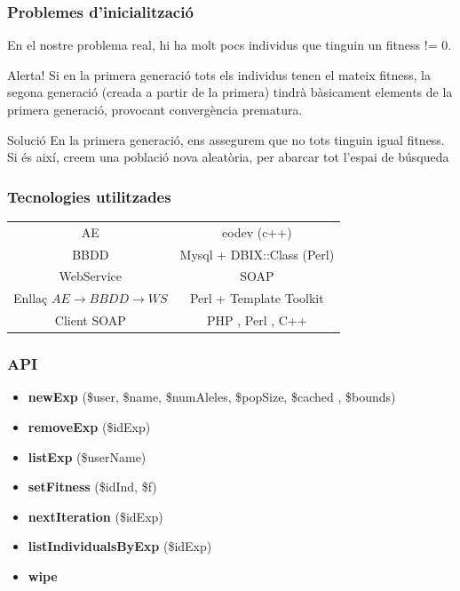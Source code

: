 \documentclass{beamer}
\begin{document}
\begin{frame}
\frametitle{Problemes d'inicialització}
En el nostre problema real, hi ha molt pocs individus que tinguin un fitness !=
0.
\pause
\begin{alertblock}{Alerta!}
Si en la primera generació tots els individus tenen el mateix fitness, la segona
generació (creada a partir de la primera) tindrà bàsicament elements de la
primera generació, provocant convergència prematura.
\end{alertblock}
\pause
\begin{exampleblock}{Solució}
En la primera generació, ens assegurem que no tots tinguin igual fitness.  Si és
així, creem una població nova aleatòria, per abarcar tot l'espai de búsqueda
\end{exampleblock}
\end{frame}

\begin{frame}
\frametitle{Tecnologies utilitzades}
\begin{tabular}[h!]{|c|c|}
AE & eodev (c++) \\
BBDD & Mysql + DBIX::Class (Perl) \\
WebService & SOAP \\
Enllaç $AE\rightarrow BBDD\rightarrow WS$ & Perl + Template Toolkit\\
Client SOAP & PHP , Perl , C++ \\
\end{tabular}
\end{frame}

\begin{frame}
	\frametitle{API}
	\begin{itemize}
		\item \textbf{newExp} (\$user, \$name, \$numAleles, \$popSize, \$cached , \$bounds)
		\item \textbf{removeExp} (\$idExp)
		\item \textbf{listExp} (\$userName)
		\item \textbf{setFitness} (\$idInd, \$f)
		\item \textbf{nextIteration} (\$idExp)
		\item \textbf{listIndividualsByExp} (\$idExp)
		\item \textbf{wipe}
	\end{itemize}
\end{frame}
\end{document}
